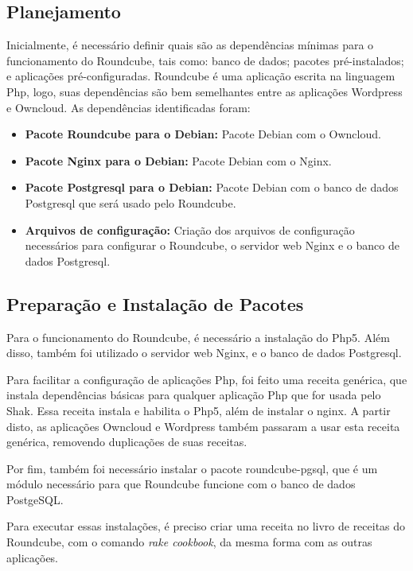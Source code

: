 \subsection{Planejamento}

Inicialmente, é necessário definir quais são as dependências
mínimas para o funcionamento do Roundcube, tais como: banco de dados; pacotes
pré-instalados; e aplicações pré-configuradas. Roundcube é uma aplicação escrita
na linguagem Php, logo, suas dependências são bem semelhantes entre as aplicações
Wordpress e Owncloud. As dependências identificadas foram:

\begin{itemize}
   \item \textbf{Pacote Roundcube para o Debian:} Pacote Debian com o Owncloud.
   \item \textbf{Pacote Nginx para o Debian:} Pacote Debian com o Nginx.
   \item \textbf{Pacote Postgresql para o Debian:} Pacote Debian com o banco de dados Postgresql
   que será usado pelo Roundcube.
   \item \textbf{Arquivos de configuração:} Criação dos arquivos de configuração
   necessários para configurar o Roundcube, o servidor web Nginx e o banco de dados
   Postgresql.
\end{itemize}

\subsection{Preparação e Instalação de Pacotes}

Para o funcionamento do Roundcube, é necessário a instalação do Php5. Além
disso, também foi utilizado o servidor web Nginx, e o 
banco de dados Postgresql.

Para facilitar a configuração de aplicações Php, foi feito uma receita genérica,
que instala dependências básicas para qualquer aplicação Php que for usada pelo
Shak. Essa receita instala e habilita o Php5, além de instalar o nginx. A partir
disto, as aplicações Owncloud e Wordpress também passaram a usar esta receita
genérica, removendo duplicações de suas receitas.

Por fim, também foi necessário instalar o pacote roundcube-pgsql, que é um módulo 
necessário para que Roundcube funcione com o banco de dados PostgeSQL.
 
Para executar essas instalações, é preciso criar uma receita no livro de receitas
do Roundcube, com o comando \textit{rake cookbook}, da mesma forma com as outras aplicações.
 
